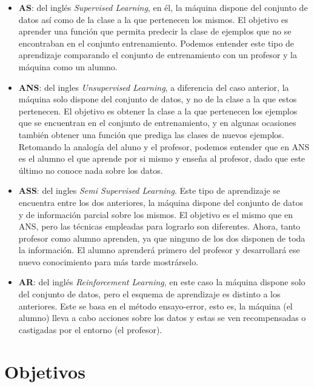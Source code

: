\begin{itemize}
	
	\item \textbf{\acf{AS}}: del inglés \textit{Supervised Learning}, en él, la máquina dispone del conjunto de datos así como de la clase a la que pertenecen los mismos. El objetivo es aprender una función que permita predecir la clase de ejemplos que no se encontraban en el conjunto entrenamiento. Podemos entender este tipo de aprendizaje comparando el conjunto de entrenamiento con un profesor y la máquina como un alumno.
	
	\item \textbf{\acf{ANS}}: del ingles \textit{Unsupervised Learning}, a diferencia del caso anterior, la máquina solo dispone del conjunto de datos, y no de la clase a la que estos pertenecen. El objetivo es obtener la clase a la que pertenecen los ejemplos que se encuentran en el conjunto de entrenamiento, y en algunas ocasiones también obtener una función que prediga las clases de nuevos ejemplos. Retomando la analogía del aluno y el profesor, podemos entender que en \acs{ANS} es el alumno el que aprende por si mismo y enseña al profesor, dado que este último no conoce nada sobre los datos.
	
	\item \textbf{\acf{ASS}}: del ingles \textit{Semi Supervised Learning}. Este tipo de aprendizaje se encuentra entre los dos anteriores, la máquina dispone del conjunto de datos y de información parcial sobre los mismos. El objetivo es el mismo que en \acs{ANS}, pero las técnicas empleadas para lograrlo son diferentes. Ahora, tanto profesor como alumno aprenden, ya que ninguno de los dos disponen de toda la información. El alumno aprenderá primero del profesor y desarrollará ese nuevo conocimiento para más tarde mostrárselo.
	
	\item \textbf{\acf{AR}}: del inglés \textit{Reinforcement Learning}, en este caso la máquina dispone solo del conjunto de datos, pero el esquema de aprendizaje es distinto a los anteriores. Este se basa en el método ensayo-error, esto es, la máquina (el alumno) lleva a cabo acciones sobre los datos y estas se ven recompensadas o castigadas por el entorno (el profesor).
	
\end{itemize}

\section{Objetivos}

